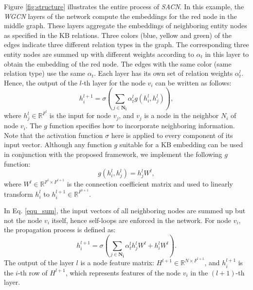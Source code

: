 \documentclass[letterpaper]{article} \usepackage{aaai19}  \usepackage{times}  \usepackage{helvet}  \usepackage{courier}  \usepackage{url}  \usepackage{graphicx}  \usepackage{amsmath}
\begin{document}
Figure \ref{fig:structure} illustrates the entire process of {\it SACN}. In this example, the {\it WGCN} layers of the network compute the embeddings for the red node in the middle graph. These layers aggregate the embeddings of neighboring entity nodes as specified in the KB relations. Three colors (blue, yellow and green) of the edges indicate three different relation types in the graph. The corresponding three entity nodes are summed up with different weights according to $\alpha_t$ in this layer to obtain the embedding of the red node. The edges with the same color (same relation type) use the same $\alpha_t$. Each layer has its own set of relation weights $\alpha_{t}^l$. Hence, the output of the $l$-th layer for the node $v_i$  can be written as follows:
\begin{equation} \label{equ_sum}
h^{l+1}_i = \sigma\left(\sum_{j \in \mathbf{N_i}} \alpha_{t}^l g( h^{l}_i,  h^{l}_j ) \right) ,
\end{equation}
where $h^{l}_j \in \mathbb{R}^{F^{l}}$ is the input for node $v_j$, and $v_j$ is a node in the neighbor $N_i$ of node $v_i$. The $g$ function specifies how to incorporate neighboring information. Note that the activation function $\sigma$ here is applied to every component of its input vector. 
Although any function $g$ suitable for a KB embedding can be used in conjunction with the proposed framework, we implement the following $g$ function:
\begin{equation} \label{equ_gm}
g(h^{l}_i,  h^{l}_j ) = h_j^l W^{l} ,
\end{equation}
where $W^l \in \mathbb{R}^{F^l \times F^{l+1}}$ is the connection coefficient matrix and used to linearly transform $h^l_i$ to $h^{l+1}_i \in \mathbb{R}^{F^{l+1}}$.

In Eq. \eqref{equ_sum}, the input vectors of all neighboring nodes are summed up but not the node $v_i$ itself, hence self-loops are enforced in the network. For node $v_i$, the propagation process is defined as:
\begin{equation} 
h^{l+1}_i = \sigma(\sum_{j \in \mathbf{N_i}} \alpha^l_{t} h_j^l W^{l} + h_i^l W^{l}) .
\end{equation}The output of the layer $l$ is a node feature matrix: $ H^{l+1} \in {\mathbb{R}}^{N \times F^{l+1}}$, and $h^{l+1}_i$  is the $i$-th row of $H^{l+1}$, which represents features of the node $v_i$ in the $(l+1)$-th layer.
\end{document}
